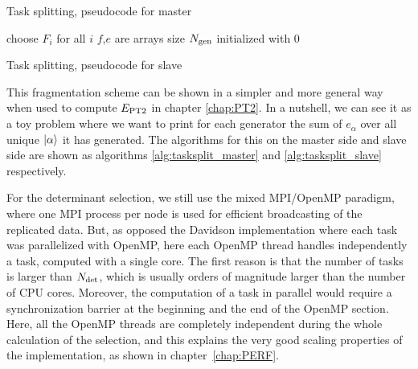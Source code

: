 \documentclass[./thesis.tex]{subfiles}
\begin{document}
\begin{algorithm}
        \caption{Task splitting, pseudocode for master}
        \label{alg:tasksplit_master}
        choose $F_i$ for all $i$\;
        $f$,$e$ are arrays size ${N_\text{gen}}$ initialized with $0$ \;
\end{algorithm}

\begin{algorithm}
        \caption{Task splitting, pseudocode for slave}
        \label{alg:tasksplit_slave}
\end{algorithm}

This fragmentation scheme can be shown in a simpler and more general way when used to compute $E_\text{PT2}$ in chapter \ref{chap:PT2}. In a nutshell, we can see it as a toy problem where we want to print for each generator the sum of $e_\alpha$ over all unique ${\ket{\alpha}}$ it has generated. The algorithms for this on the master side and slave side are shown as algorithms \ref{alg:tasksplit_master} and \ref{alg:tasksplit_slave} respectively.


For the determinant selection, we still use the mixed MPI/OpenMP paradigm, where one MPI process per node is used for efficient broadcasting of the replicated data. But, as opposed the Davidson implementation where each task was parallelized with OpenMP, here each OpenMP thread handles independently a task, computed with a single core. The first reason is that the number of tasks is larger than ${N_\text{det}}$, which is usually orders of magnitude larger than the number of CPU cores. Moreover, the computation of a task in parallel would require a synchronization barrier at the beginning and the end of the OpenMP section. Here, all the OpenMP threads are completely independent during the whole calculation of the selection, and this explains the very good scaling properties of the implementation, as shown in chapter~\ref{chap:PERF}.
\end{document}
